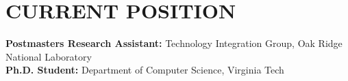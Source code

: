 \section{CURRENT POSITION}
\vspace{0.03in}
{\bf Postmasters Research Assistant:} Technology Integration Group,
Oak Ridge National Laboratory \\
{\bf Ph.D. Student:} Department of Computer Science, Virginia Tech

